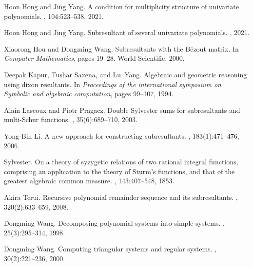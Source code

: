 \documentclass{article}
\begin{document}
\begin{thebibliography}{10}
Hoon Hong and Jing Yang.
\newblock A condition for multiplicity structure of univariate polynomials.
, 104:523--538, 2021.

Hoon Hong and Jing Yang.
\newblock Subresultant of several univariate polynomials.
, 2021.

Xiaorong Hou and Dongming Wang.
\newblock Subresultants with the B{\'e}zout matrix.
\newblock In {\em Computer Mathematics}, pages 19--28. World Scientific, 2000.

Deepak Kapur, Tushar Saxena, and Lu~Yang.
\newblock Algebraic and geometric reasoning using dixon resultants.
\newblock In {\em Proceedings of the international symposium on Symbolic and
  algebraic computation}, pages 99--107, 1994.

Alain Lascoux and Piotr Pragacz.
\newblock Double Sylvester sums for subresultants and multi-Schur functions.
, 35(6):689--710, 2003.

Yong-Bin Li.
\newblock A new approach for constructing subresultants.
, 183(1):471--476, 2006.

Sylvester.
\newblock On a theory of syzygetic relations of two rational integral
  functions, comprising an application to the theory of Sturm's functions, and
  that of the greatest algebraic common measure.
, 143:407--548, 1853.

Akira Terui.
\newblock Recursive polynomial remainder sequence and its subresultants.
, 320(2):633--659, 2008.

Dongming Wang.
\newblock Decomposing polynomial systems into simple systems.
, 25(3):295--314, 1998.

Dongming Wang.
\newblock Computing triangular systems and regular systems.
, 30(2):221--236, 2000.

\end{thebibliography}

%
\end{document}
